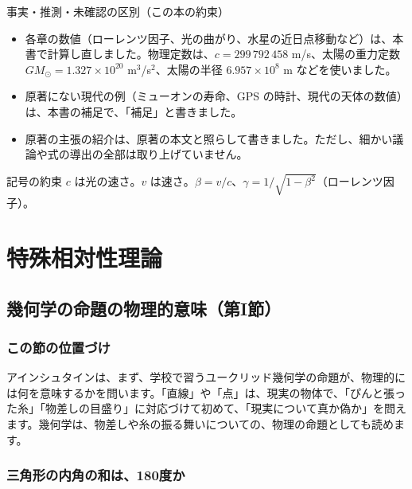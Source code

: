 \documentclass[a4paper,11pt,openany]{ltjsbook}
\begin{document}
\begin{notebox}{事実・推測・未確認の区別（この本の約束）}
\begin{itemize}[leftmargin=*]
\item 各章の数値（ローレンツ因子、光の曲がり、水星の近日点移動など）は、本書で計算し直しました。物理定数は、$c=299\,792\,458$ m/s、太陽の重力定数 $GM_\odot=1.327\times10^{20}$ m$^3$/s$^2$、太陽の半径 $6.957\times10^{8}$ m などを使いました。
\item 原著にない現代の例（ミューオンの寿命、GPS の時計、現代の天体の数値）は、本書の補足で、「補足」と書きました。
\item 原著の主張の紹介は、原著の本文と照らして書きました。ただし、細かい議論や式の導出の全部は取り上げていません。
\end{itemize}
\end{notebox}

\begin{pointbox}{記号の約束}
$c$ は光の速さ。$v$ は速さ。$\beta=v/c$、$\gamma=1/\sqrt{1-\beta^2}$（ローレンツ因子）。
\end{pointbox}

\part{特殊相対性理論}

\chapter{幾何学の命題の物理的意味（第I節）}

\section{この節の位置づけ}

アインシュタインは、まず、学校で習うユークリッド幾何学の命題が、物理的には何を意味するかを問います。「直線」や「点」は、現実の物体で、「ぴんと張った糸」「物差しの目盛り」に対応づけて初めて、「現実について真か偽か」を問えます。幾何学は、物差しや糸の振る舞いについての、物理の命題としても読めます。

\section{三角形の内角の和は、180度か}
\end{document}
